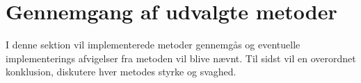 \chapter{Gennemgang af udvalgte metoder}\label{sec:detmet}
I denne sektion vil implementerede metoder gennemgås og eventuelle implementerings afvigelser fra metoden vil blive nævnt. Til sidst vil en overordnet konklusion, diskutere hver metodes styrke og svaghed. 



